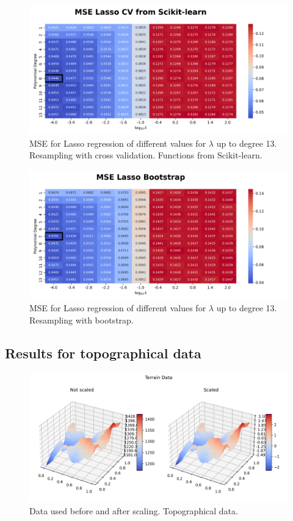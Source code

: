 \documentclass{article}
\begin{document}
\begin{figure}[htbp]
    \centering
    \includegraphics[width=\textwidth]{Project1/figures/Franke/Heatmap_MSE_Lasso_CV_from_Scikit-learn.png}
    \caption{MSE for Lasso regression of different values for $\lambda$ up to degree 13. Resampling with cross validation. Functions from Scikit-learn.}
    \label{fig:LassoCVsklearn}
\end{figure}

\begin{figure}[htbp]
    \centering
    \includegraphics[width=\textwidth]{Project1/figures/Franke/Heatmap_MSE_Lasso_Bootstrap.png}
    \caption{MSE for Lasso regression of different values for $\lambda$ up to degree 13. Resampling with bootstrap.}
    \label{fig:LassoBootstrap}
\end{figure}


\newpage
\subsection{Results for topographical data}
\begin{figure}[htbp]
    \centering
    \includegraphics[width=\textwidth]{Project1/figures/Terrain/TerrainFigure.png}
    \caption{Data used before and after scaling. Topographical data.}
    \label{fig:TerrainFig}
\end{figure}
\end{document}
